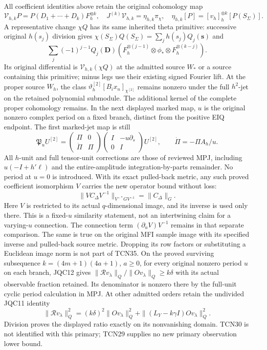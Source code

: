 \documentclass[11pt,a4paper]{article}
\begin{document}
All coefficient identities above retain the original cohomology map
\begin{equation}\tag{TCN34}
 \mathcal V_{h,k}P=P(D_1+\cdots+D_k)F_h^{\otimes k},\quad
 J^{(k)}\mathcal V_{h,k}=\eta_{h,k}\pi_\chi,
 \quad\eta_{h,k}[P]=[v_h]_h^{\otimes k}[P(S_\Sigma)].
\end{equation}
A representative change $\chi Q$ has its same inherited theta primitive:
successive original $h(s_j)$ division gives
$\chi(S_\Sigma)Q(S_\Sigma)=\sum_jh(s_j)Q_j(\mathbf s)$ and
\[
 \sum_j(-1)^{j-1}Q_j(\mathbf D)
 (F_h^{\otimes(j-1)}\otimes\phi_*\otimes F_h^{\otimes(k-j)}).
\]
Its original differential is $\mathcal V_{h,k}(\chi Q)$ at the
admitted source $W_*$ or a source containing this primitive; minus legs
use their existing signed Fourier lift. At the proper source $W_h$,
the class $\vartheta_h^{[2]}[B_ix_n]_{\chi^{[2]}}$ remains nonzero
under the full $h^2$-jet on the retained polynomial submodule.
The additional kernel of the complete proper cohomology remains.
In the next displayed marked map, $u$ is the original nonzero
complex period on a fixed branch, distinct from the positive EIQ endpoint.
The first marked-jet map is still
\[
 \mathfrak P_uU^{[2]}=
 \begin{pmatrix}\Pi&0\\\dot\Pi&\Pi\end{pmatrix}
 \begin{pmatrix}I&-u\partial_s\\0&I\end{pmatrix}U^{[2]},
 \qquad \dot\Pi=-\Pi A_h/u.
\]
All $h$-unit and full tensor-unit corrections are those of reviewed
MPJ, including $u(-I+h'\ell)$ and the entire-amplitude integration-by-parts
remainder. No period at $u=0$ is introduced.
With its exact pulled-back metric, any such proved coefficient
isomorphism $V$ carries the new operator bound without loss:
\begin{equation}\tag{TCN35}
 \|VC_\Delta V^{-1}\|_{V^{-*}GV^{-1}}=\|C_\Delta\|_G.
\end{equation}
Here $V$ is restricted to its actual $q$-dimensional image, and its
inverse is used only there. This is a fixed-$u$ similarity statement,
not an intertwining claim for a varying-$u$ connection. The connection
term $(\partial_uV)V^{-1}$ remains in that separate comparison.
The same is true on the original MFI sample image with its specified
inverse and pulled-back source metric. Dropping its row factors or
substituting a Euclidean image norm is not part of TCN35.
On the proved surviving subsequence $k=(4m+1)(4a+1)$, $a\ge0$,
for every original nonzero period $u$ on each branch, JQC12 gives
$\|\mathcal Rv_\lambda\|_Q/\|Ov_\lambda\|_Q\ge k\delta$
with its actual observable fraction retained. Its denominator is
nonzero there by the full-unit cyclic period calculation in MPJ.
At other admitted orders retain the undivided JQC11 identity
\[
 \|\mathcal Rv_\lambda\|_Q^2=(k\delta)^2\|Ov_\lambda\|_Q^2
       +\|(L_Y-k\gamma I)Ov_\lambda\|_Q^2.
\]
Division proves the displayed ratio exactly on its nonvanishing
domain. TCN30 is not identified with this primary; TCN29 supplies
no new primary observation lower bound.
\end{document}
